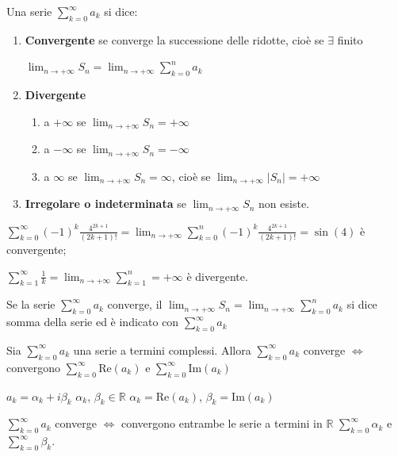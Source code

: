 \begin{definition}
	Una serie $\sum_{k=0}^{\infty} a_k$ si dice:
	\begin{enumerate}
		\item \textbf{Convergente} se converge la successione delle ridotte, cioè se $\exists$ finito
		
		$\lim_{n\rightarrow+\infty} S_n = \lim_{n\rightarrow+\infty} \sum_{k=0}^{n} a_k$
		
		\item \textbf{Divergente} 
		\begin{enumerate}
			\item a $+\infty$ se $\lim_{n\rightarrow+\infty} S_n = +\infty$
			\item a $-\infty$ se $\lim_{n\rightarrow+\infty} S_n = -\infty$
			\item a $\infty$ se $\lim_{n\rightarrow+\infty} S_n = \infty$, cioè se $\lim_{n\rightarrow+\infty} |S_n| = +\infty$
		\end{enumerate}
		
		\item  \textbf{Irregolare o indeterminata} se $\lim_{n\rightarrow+\infty} S_n$ non esiste.
	\end{enumerate}
\end{definition}

\begin{exbar}
	$\sum_{k=0}^\infty (-1)^k \frac{4^{2k+1}}{(2k+1)!} = \lim_{n\rightarrow+\infty} \sum_{k=0}^n (-1)^k \frac{4^{2k+1}}{(2k+1)!} = \sin(4)$ è convergente;
	
	$\sum_{k=1}^\infty \frac{1}{k} = \lim_{n\rightarrow+\infty}\sum_{k=1}^n = +\infty$ è divergente. 
\end{exbar}

\begin{definition}
	Se la serie $\sum_{k=0}^{\infty} a_k$ converge, il $\lim_{n\rightarrow+\infty} S_n = \lim_{n\rightarrow+\infty} \sum_{k=0}^{n} a_k$ si dice somma della serie ed è indicato con $\sum_{k=0}^\infty a_k$
\end{definition}

\begin{proposition}
	\label{prop:serie complessa}
	Sia $\sum_{k=0}^\infty a_k$ una serie a termini complessi. Allora $\sum_{k=0}^\infty a_k$ converge $\iff$ convergono $\sum_{k=0}^\infty \mathrm{Re}(a_k)$ e $\sum_{k=0}^\infty \mathrm{Im}(a_k)$
\end{proposition}

\begin{exbar}
	$a_k = \alpha_k + i \beta_k$ \qquad $\alpha_k$, $\beta_k\in\mathbb{R}$ \qquad $\alpha_k = \mathrm{Re}(a_k)$, $\beta_k = \mathrm{Im}(a_k)$
	
	$\sum_{k=0}^\infty a_k$ converge $\iff$ convergono entrambe le serie a termini in $\mathbb{R}$ $\sum_{k=0}^\infty \alpha_k$ e $\sum_{k=0}^\infty \beta_k$.
\end{exbar}


